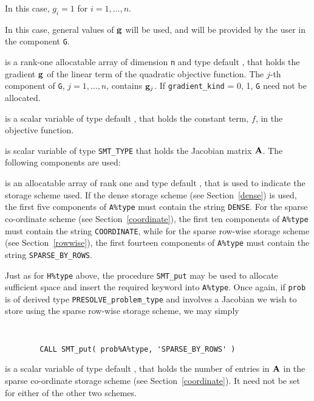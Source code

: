 \documentclass{galahad}
\newcommand{\packagename}{PRESOLVE}
\begin{document}
\begin{description}
\begin{description}
 In this case, $g_{i} = 1$ for $i = 1, \ldots ,n$.

 In this case, general values of ${\mathbf{g}}$ will be used,
     and will be provided by the user in the component {\tt G}.
\end{description}

 is a rank-one allocatable array of dimension {\tt n} and type 
default \realdp, that holds the gradient ${\mathbf{g}}$ 
of the linear term of the quadratic objective function.
The $j$-th component of {\tt G}, $j = 1,  \ldots ,  n$, contains ${\mathbf{g}}_{j}$.
If {\tt gradient\_kind} {= 0, 1}, {\tt G} need not be allocated.

 is a scalar variable of type 
default \realdp, that holds 
the constant term, $f$, in the objective function.

 is scalar variable of type {\tt SMT\_TYPE} 
that holds the Jacobian matrix ${\mathbf{A}}$. The following components are used:

\begin{description}

 is an allocatable array of rank one and type default \character, that
is used to indicate the storage scheme used. If the dense storage scheme 
(see Section~\ref{dense}) is used, 
the first five components of {\tt A\%type} must contain the
string {\tt DENSE}.
For the sparse co-ordinate scheme (see Section~\ref{coordinate}), 
the first ten components of {\tt A\%type} must contain the
string {\tt COORDINATE}, while 
for the sparse row-wise storage scheme (see Section~\ref{rowwise}),
the first fourteen components of {\tt A\%type} must contain the
string {\tt SPARSE\_BY\_ROWS}.

Just as for {\tt H\%type} above, the procedure {\tt SMT\_put} 
may be used to allocate sufficient space and insert the required keyword
into {\tt A\%type}.
Once again, if {\tt prob} is of derived type {\tt \packagename\_problem\_type}
and involves a Jacobian we wish to store using the sparse row-wise 
storage scheme, we may simply
{\tt 
\begin{verbatim}
        CALL SMT_put( prob%A%type, 'SPARSE_BY_ROWS' )
\end{verbatim}
}
\noindent

 is a scalar variable of type default \integer, that 
holds the number of entries in ${\mathbf{A}}$
in the sparse co-ordinate storage scheme (see Section~\ref{coordinate}). 
It need not be set for either of the other two schemes.


\end{description}
\end{description}
\end{document}
